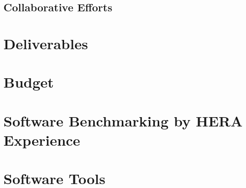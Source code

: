 \documentclass[]{article}
\begin{document}
\subsection{Collaborative Efforts}

\section{Deliverables}

\section{Budget}

{}


\newpage 
\appendix
\section{Software Benchmarking by HERA Experience}


\section{Software Tools}

\end{document}
